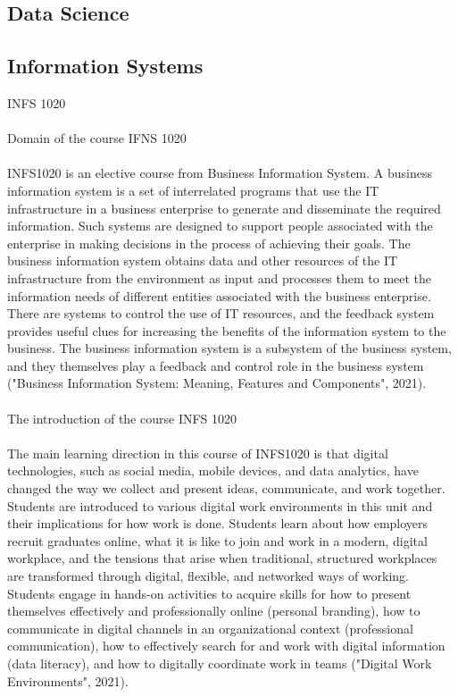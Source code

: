 \documentclass{article}
\begin{document}
	
	\subsection{Data Science}
	\subsection{Information Systems}
	INFS 1020 \\
	\\
	Domain of the course IFNS 1020 \\
	\\
	INFS1020 is an elective course from Business Information System. A business information system is a set of interrelated programs that use the IT infrastructure in a business enterprise to generate and disseminate the required information. Such systems are designed to support people associated with the enterprise in making decisions in the process of achieving their goals. The business information system obtains data and other resources of the IT infrastructure from the environment as input and processes them to meet the information needs of different entities associated with the business enterprise. There are systems to control the use of IT resources, and the feedback system provides useful clues for increasing the benefits of the information system to the business. The business information system is a subsystem of the business system, and they themselves play a feedback and control role in the business system ("Business Information System: Meaning, Features and Components", 2021). \\
	\\
	The introduction of the course INFS 1020 \\
	\\
	The main learning direction in this course of INFS1020 is that digital technologies, such as social media, mobile devices, and data analytics, have changed the way we collect and present ideas, communicate, and work together. Students are introduced to various digital work environments in this unit and their implications for how work is done. Students learn about how employers recruit graduates online, what it is like to join and work in a modern, digital workplace, and the tensions that arise when traditional, structured workplaces are transformed through digital, flexible, and networked ways of working. Students engage in hands-on activities to acquire skills for how to present themselves effectively and professionally online (personal branding), how to communicate in digital channels in an organizational context (professional communication), how to effectively search for and work with digital information (data literacy), and how to digitally coordinate work in teams ("Digital Work Environments", 2021). \\
\end{document}
